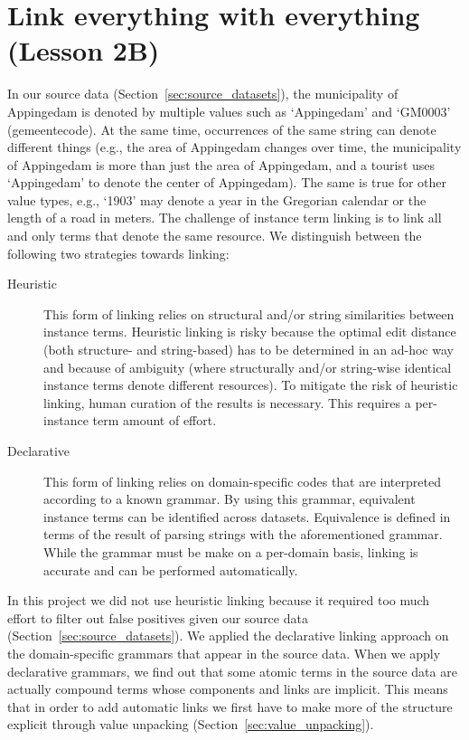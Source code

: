 \documentclass[a4paper]{scrartcl}
\begin{document}
\section{Link everything with everything (Lesson 2B)}
\label{sec:link}

In our source data (Section~\ref{sec:source_datasets}), the
municipality of Appingedam is denoted by multiple values such as
`Appingedam' and `GM0003' (gemeentecode).  At the same time,
occurrences of the same string can denote different things (e.g., the
area of Appingedam changes over time, the municipality of Appingedam
is more than just the area of Appingedam, and a tourist uses
`Appingedam' to denote the center of Appingedam).  The same is true
for other value types, e.g., `1903' may denote a year in the Gregorian
calendar or the length of a road in meters.  The challenge of instance
term linking is to link all and only terms that denote the same
resource.  We distinguish between the following two strategies towards
linking:

\begin{description}

\item [Heuristic] This form of linking relies on structural and/or
  string similarities between instance terms.  Heuristic linking is
  risky because the optimal edit distance (both structure- and
  string-based) has to be determined in an ad-hoc way and because of
  ambiguity (where structurally and/or string-wise identical instance
  terms denote different resources).  To mitigate the risk of
  heuristic linking, human curation of the results is necessary.  This
  requires a per-instance term amount of effort.

\item [Declarative] This form of linking relies on domain-specific
  codes that are interpreted according to a known grammar.  By using
  this grammar, equivalent instance terms can be identified across
  datasets.  Equivalence is defined in terms of the result of parsing
  strings with the aforementioned grammar.  While the grammar must be
  make on a per-domain basis, linking is accurate and can be performed
  automatically.

\end{description}

In this project we did not use heuristic linking because it required
too much effort to filter out false positives given our source data
(Section~\ref{sec:source_datasets}).  We applied the declarative
linking approach on the domain-specific grammars that appear in the
source data.  When we apply declarative grammars, we find out that
some atomic terms in the source data are actually compound terms whose
components and links are implicit.  This means that in order to add
automatic links we first have to make more of the structure explicit
through value unpacking (Section~\ref{sec:value_unpacking}).
\end{document}
